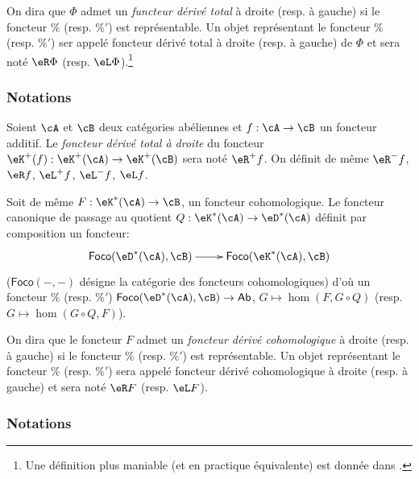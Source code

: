 \begin{definition}\label{VIII:4-1-2}
On dira que $\Phi$ admet un \emph{functeur dérivé total} à droite (resp. 
à gauche) si le foncteur $\%$ (resp. $\%'$) est représentable. Un objet 
représentant le foncteur $\%$ (resp. $\%'$) ser appelé foncteur dérivé 
total à droite (resp. à gauche) de $\Phi$ et sera noté 
$\eR \Phi$ (resp. $\eL \Phi$).\footnote{Une définition plus maniable (et en 
practique équivalente) est donnée dans \cite[XVII 1.2]{sga4}.}
\end{definition}





\subsubsection{Notations}\label{VIII:4-1-3}

Soient $\cA$ et $\cB$ deux catégories abéliennes et $f:\cA\to \cB$ un 
foncteur additif. Le \emph{foncteur dérivé total à droite} du foncteur 
$\eK^+(f):\eK^+(\cA) \to \eK^+(\cB)$ sera noté $\eR^+ f$. On définit de 
même $\eR^- f$, $\eR f$, $\eL^+ f$, $\eL^- f$, $\eL f$. 

Soit de même $F:\eK^\ast(\cA) \to \cB$, un foncteur cohomologique. Le 
foncteur canonique de passage au quotient $Q:\eK^\ast(\cA) \to \eD^\ast(\cA)$ 
définit par composition un foncteur: 
\[\xymatrix{
  \mathsf{Foco}(\eD^\ast(\cA),\cB) \ar[r] 
    & \mathsf{Foco}(\eK^\ast(\cA),\cB) 
}\]
($\mathsf{Foco}(-,-)$ désigne la catégorie des foncteurs cohomologiques) 
d'où un foncteur $\%$ (resp. $\%'$) 
$\mathsf{Foco}(\eD^\ast(\cA),\cB) \to \mathsf{Ab}$, $G\mapsto \hom(F,G\circ Q)$ 
(resp. $G\mapsto \hom(G\circ Q,F)$). 





\begin{definition}\label{VIII:4-1-4}
On dira que le foncteur $F$ admet un \emph{foncteur dérivé cohomologique} 
à droite (resp. à gauche) si le foncteur $\%$ (resp. $\%'$) est 
représentable. Un objet représentant le foncteur $\%$ (resp. $\%'$) sera 
appelé foncteur dérivé cohomologique à droite (resp. à gauche) et 
sera noté $\eR F$ (resp. $\eL F$). 
\end{definition}





\subsubsection{Notations}\label{VIII:4-1-5}


